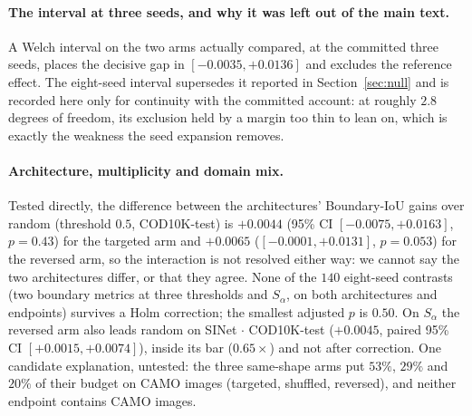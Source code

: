 \documentclass{article}
\newif\ifrevmarked \revmarkedtrue
\newenvironment{revblock}[1]{\ifrevmarked\color{#1}\fi}{}
\begin{document}


\paragraph{The interval at three seeds, and why it was left out of the main text.} A Welch interval on the two
arms actually compared, at the committed three seeds, places the decisive gap in
$[-0.0035, +0.0136]$ and excludes the reference effect. The eight-seed interval supersedes it
reported in Section~\ref{sec:null} and is recorded here only for continuity with the committed
account: at roughly $2.8$ degrees of freedom, its exclusion held by a margin too thin to lean on,
which is exactly the weakness the seed expansion removes.

\begin{revblock}{RevShared}

\end{revblock}

\begin{revblock}{RevC}
\paragraph{Architecture, multiplicity and domain mix.} Tested directly, the difference between the architectures'
Boundary-IoU gains over random (threshold $0.5$, COD10K-test) is $+0.0044$ (95\% CI $[-0.0075, +0.0163]$, $p = 0.43$)
for the targeted arm and $+0.0065$ ($[-0.0001, +0.0131]$, $p = 0.053$) for the reversed arm, so the interaction is not
resolved either way: we cannot say the two architectures differ, or that they agree. None of the $140$ eight-seed
contrasts (two boundary metrics at three thresholds and $S_\alpha$, on both architectures and endpoints) survives a Holm
correction; the smallest adjusted $p$ is $0.50$. On $S_\alpha$ the reversed arm also leads random on SINet $\cdot$
COD10K-test ($+0.0045$, paired 95\% CI $[+0.0015, +0.0074]$), inside its bar ($0.65\times$) and not after correction.
One candidate explanation, untested: the three same-shape arms put $53\%$, $29\%$ and $20\%$ of their budget on CAMO
images (targeted, shuffled, reversed), and neither endpoint contains CAMO images.
\end{revblock}
\end{document}
